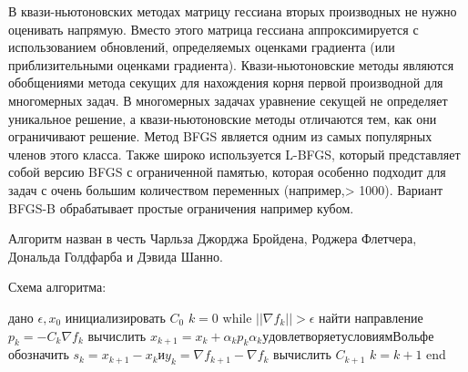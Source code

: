 \documentclass[12pt]{article} %
\begin{document}
В квази-ньютоновских методах матрицу гессиана вторых производных не нужно оценивать напрямую. Вместо этого матрица гессиана аппроксимируется с использованием обновлений, определяемых оценками градиента (или приблизительными оценками градиента). Квази-ньютоновские методы являются обобщениями метода секущих для нахождения корня первой производной для многомерных задач. В многомерных задачах уравнение секущей не определяет уникальное решение, а квази-ньютоновские методы отличаются тем, как они ограничивают решение. Метод BFGS является одним из самых популярных членов этого класса\cite{5}. Также широко используется L-BFGS, который представляет собой версию BFGS с ограниченной памятью, которая особенно подходит для задач с очень большим количеством переменных (например,> 1000). Вариант BFGS-B обрабатывает простые ограничения например кубом.

Алгоритм назван в честь Чарльза Джорджа Бройдена, Роджера Флетчера, Дональда Голдфарба и Дэвида Шанно.

Схема алгоритма:
\begin{flushleft}
	дано $ \epsilon , x_{0} $ \newline
	инициализировать $C_{0}$ \newline
	$ k=0$ \newline
	while $||\nabla f_{k}||>\epsilon$ \newline
	найти направление $p_{k}=-C_{k}\nabla f_{k}$ \newline
	вычислить $x_{k+1}=x_{k}+\alpha _{k}p_{k} \alpha _{k} удовлетворяет условиям Вольфе $ \newline
	обозначить $s_{k}=x_{k+1}-x_{k} и y_{k}=\nabla f_{k+1}-\nabla f_{k} $ \newline
	вычислить $C_{k+1}$ \newline
	$ k=k+1$ \newline
	end \newline
\end{flushleft}




\newpage
\end{document}
